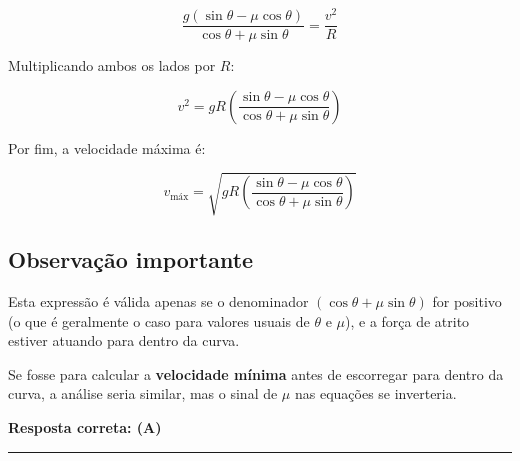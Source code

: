\documentclass[a4paper,12pt]{article}
\begin{document}
\begin{flushleft}
\begin{equation}
\frac{g \left( \sin\theta - \mu \cos\theta \right)}{\cos\theta + \mu \sin\theta} = \frac{v^2}{R}
\end{equation}

Multiplicando ambos os lados por \( R \):

\begin{equation}
v^2 = gR \left( \frac{ \sin\theta - \mu \cos\theta }{ \cos\theta + \mu \sin\theta } \right)
\end{equation}

Por fim, a velocidade máxima é:

\begin{equation}
v_{\text{máx}} = \sqrt{ gR \left( \frac{ \sin\theta - \mu \cos\theta }{ \cos\theta + \mu \sin\theta } \right) }
\end{equation}

\subsection*{Observação importante}

Esta expressão é válida apenas se o denominador \( \left( \cos\theta + \mu \sin\theta \right) \) for positivo (o que é geralmente 
o caso para valores usuais de \(\theta\) e \(\mu\)), e a força de atrito estiver atuando para dentro da curva.

Se fosse para calcular a \textbf{velocidade mínima} antes de escorregar para dentro da curva, a análise seria similar, 
mas o sinal de \(\mu\) nas equações se inverteria.

\textbf{Resposta correta: \colorbox{green!50}{(A)}}

\end{flushleft}
\noindent\rule{\linewidth}{0.6pt}\\
\end{document}
